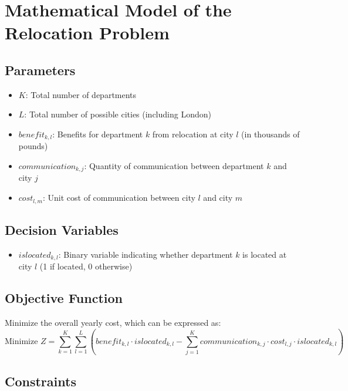 \documentclass{article}
\begin{document}
\section*{Mathematical Model of the Relocation Problem}

\subsection*{Parameters}
\begin{itemize}
    \item $K$: Total number of departments
    \item $L$: Total number of possible cities (including London)
    \item $benefit_{k, l}$: Benefits for department $k$ from relocation at city $l$ (in thousands of pounds)
    \item $communication_{k, j}$: Quantity of communication between department $k$ and city $j$
    \item $cost_{l, m}$: Unit cost of communication between city $l$ and city $m$
\end{itemize}

\subsection*{Decision Variables}
\begin{itemize}
    \item $islocated_{k, l}$: Binary variable indicating whether department $k$ is located at city $l$ (1 if located, 0 otherwise)
\end{itemize}

\subsection*{Objective Function}
Minimize the overall yearly cost, which can be expressed as:
\[
\text{Minimize } Z = \sum_{k=1}^{K} \sum_{l=1}^{L} \left( benefit_{k, l} \cdot islocated_{k, l} - \sum_{j=1}^{K} communication_{k, j} \cdot cost_{l, j} \cdot islocated_{k, l} \right)
\]

\subsection*{Constraints}
\end{document}
